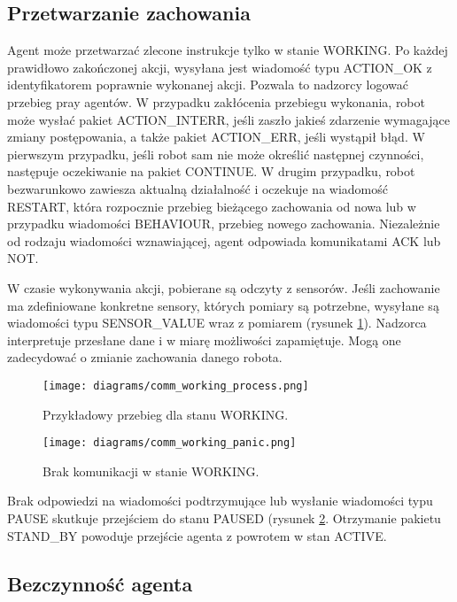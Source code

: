 \subsection{Przetwarzanie zachowania}

Agent może przetwarzać zlecone instrukcje tylko w stanie WORKING. Po każdej prawidłowo zakończonej akcji, wysyłana jest wiadomość typu ACTION\_OK z identyfikatorem poprawnie wykonanej akcji. Pozwala to nadzorcy logować przebieg pray agentów. W przypadku zakłócenia przebiegu wykonania, robot może wysłać pakiet ACTION\_INTERR, jeśli zaszło jakieś zdarzenie wymagające zmiany postępowania, a także pakiet ACTION\_ERR, jeśli wystąpił błąd. W pierwszym przypadku, jeśli robot sam nie może określić następnej czynności, następuje oczekiwanie na pakiet CONTINUE. W drugim przypadku, robot bezwarunkowo zawiesza aktualną działalność i oczekuje na wiadomość RESTART, która rozpocznie przebieg bieżącego zachowania od nowa lub w przypadku wiadomości BEHAVIOUR, przebieg nowego zachowania. Niezależnie od rodzaju wiadomości wznawiającej, agent odpowiada komunikatami ACK lub NOT.

W czasie wykonywania akcji, pobierane są odczyty z sensorów. Jeśli zachowanie ma zdefiniowane konkretne sensory, których pomiary są potrzebne, wysyłane są wiadomości typu SENSOR\_VALUE wraz z pomiarem (rysunek \ref{fig:comm_working_process}). Nadzorca interpretuje przesłane dane i w miarę możliwości zapamiętuje. Mogą one zadecydować o zmianie zachowania danego robota.

\begin{figure}[!ht]
    \centering
        \texttt{[image: diagrams/comm\_working\_process.png]}
    \caption{Przykładowy przebieg dla stanu WORKING.\label{fig:comm_working_process}}
\end{figure}

\begin{figure}[!ht]
    \centering
        \texttt{[image: diagrams/comm\_working\_panic.png]}
    \caption{Brak komunikacji w stanie WORKING.\label{fig:comm_working_panic}}
\end{figure}

Brak odpowiedzi na wiadomości podtrzymujące lub wysłanie wiadomości typu PAUSE skutkuje przejściem do stanu PAUSED (rysunek \ref{fig:comm_working_panic}. Otrzymanie pakietu STAND\_BY powoduje przejście agenta z powrotem w stan ACTIVE.

\subsection{Bezczynność agenta}

